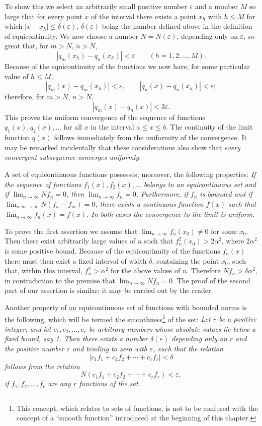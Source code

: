 To show this we select an arbitrarily small positive number $\varepsilon$ and a number $M$ so large that for every point $x$ of the interval there exists a point $x_h$ with $h\le M$ for which $|x-x_h|\le\delta(\varepsilon)$, $\delta(\varepsilon)$ being the number defined above in the definition of equicontinuity. We now choose a number $N=N(\varepsilon)$, depending only on $\varepsilon$, so great that, for $m>N$, $n>N$,
\[
|q_m(x_h)-q_n(x_h)|<\varepsilon\qquad(h=1,2,\ldots,M).
\]
Because of the equicontinuity of the functions we now have, for some particular value of $h\le M$,
\[
|q_m(x)-q_m(x_h)|<\varepsilon,
\qquad
|q_n(x)-q_n(x_h)|<\varepsilon;
\]
therefore, for $m>N$, $n>N$,
\[
|q_m(x)-q_n(x)|<3\varepsilon.
\]
This proves the uniform convergence of the sequence of functions $q_1(x),q_2(x),\ldots$ for all $x$ in the interval $a\le x\le b$. The continuity of the limit function $q(x)$ follows immediately from the uniformity of the convergence. It may be remarked incidentally that these considerations also show that \emph{every convergent subsequence converges uniformly}.

A set of equicontinuous functions possesses, moreover, the following properties: \emph{If the sequence of functions $f_1(x),f_2(x),\ldots$ belongs to an equicontinuous set and if $\lim_{n\to\infty}Nf_n=0$, then $\lim_{n\to\infty}f_n=0$. Furthermore, if $f_n$ is bounded and if $\lim_{n,m\to\infty}N(f_n-f_m)=0$, there exists a continuous function $f(x)$ such that $\lim_{n\to\infty}f_n(x)=f(x)$. In both cases the convergence to the limit is uniform.}

To prove the first assertion we assume that $\lim_{n\to\infty}f_n(x_0)\ne0$ for some $x_0$. Then there exist arbitrarily large values of $n$ such that $f_n^2(x_0)>2\alpha^2$, where $2\alpha^2$ is some positive bound. Because of the equicontinuity of the functions $f_n(x)$ there must then exist a fixed interval of width $\delta$, containing the point $x_0$, such that, within this interval, $f_n^2>\alpha^2$ for the above values of $n$. Therefore $Nf_n>\delta\alpha^2$, in contradiction to the premise that $\lim_{n\to\infty}Nf_n=0$. The proof of the second part of our assertion is similar; it may be carried out by the reader.

Another property of an equicontinuous set of functions with bounded norms is the following, which will be termed the smoothness\footnote{This concept, which relates to sets of functions, is not to be confused with the concept of a ``smooth function'' introduced at the beginning of this chapter.} of the set: \emph{Let $r$ be a positive integer, and let $c_1,c_2,\ldots,c_r$ be arbitrary numbers whose absolute values lie below a fixed bound, say 1. Then there exists a number $\delta(\varepsilon)$ depending only on $r$ and the positive number $\varepsilon$ and tending to zero with $\varepsilon$, such that the relation
\[
|c_1f_1+c_2f_2+\cdots+c_rf_r|<\delta
\]
follows from the relation
\[
N(c_1f_1+c_2f_2+\cdots+c_rf_r)<\varepsilon,
\]
if $f_1,f_2,\ldots,f_r$ are any $r$ functions of the set.}

